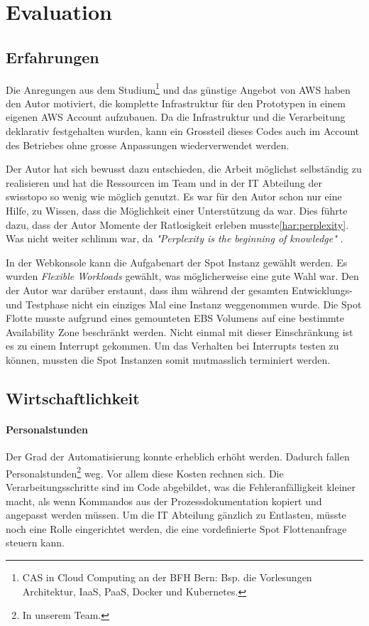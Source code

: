 \section{Evaluation}
\subsection{Erfahrungen}
Die Anregungen aus dem Studium\footnote{CAS in Cloud Computing an der BFH Bern: Bsp. die Vorlesungen Architektur, IaaS, PaaS, Docker und Kubernetes.} und das günstige Angebot von AWS haben den Autor motiviert, die komplette Infrastruktur für den Prototypen in einem eigenen AWS Account aufzubauen. Da die Infrastruktur und die Verarbeitung deklarativ festgehalten wurden, kann ein Grossteil dieses Codes auch im Account des Betriebes ohne grosse Anpassungen wiederverwendet werden.

Der Autor hat sich bewusst dazu entschieden, die Arbeit möglichst selbständig zu realisieren und hat die Ressourcen im Team und in der IT Abteilung der swisstopo so wenig wie möglich genutzt. Es war für den Autor schon nur eine Hilfe, zu Wissen, dass die Möglichkeit einer Unterstützung da war. Dies führte dazu, dass der Autor Momente der Ratlosigkeit erleben musste\ref{har:perplexity}. Was nicht weiter schlimm war, da \textit{"Perplexity is the beginning of knowledge"} \autocite[33]{CloudNativ:1}.

In der Webkonsole kann die Aufgabenart der Spot Instanz gewählt werden. Es wurden \emph{Flexible Workloads} gewählt, was möglicherweise eine gute Wahl war. Den der Autor war darüber erstaunt, dass ihm während der gesamten Entwicklungs- und Testphase nicht ein einziges Mal eine Instanz weggenommen wurde. Die Spot Flotte musste aufgrund eines gemounteten EBS Volumens auf eine bestimmte Availability Zone beschränkt werden. Nicht einmal mit dieser Einschränkung ist es zu einem Interrupt gekommen. Um das Verhalten bei Interrupts testen zu können, mussten die Spot Instanzen somit mutmasslich terminiert werden.


\subsection{Wirtschaftlichkeit}\label{kap:wirtschaftlichkeit}
\paragraph{Personalstunden}
Der Grad der Automatisierung konnte erheblich erhöht werden. Dadurch fallen Personalstunden\footnote{In unserem Team.} weg. Vor allem diese Kosten rechnen sich. Die Verarbeitungsschritte sind im Code abgebildet, was die Fehleranfälligkeit kleiner macht, als wenn Kommandos aus der Prozessdokumentation kopiert und angepasst werden müssen. Um die IT Abteilung gänzlich zu Entlasten, müsste noch eine Rolle eingerichtet werden, die eine vordefinierte Spot Flottenanfrage steuern kann.
